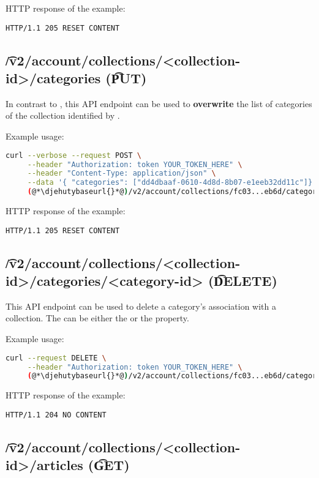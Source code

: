   HTTP response of the example:
\begin{lstlisting}
HTTP/1.1 205 RESET CONTENT
\end{lstlisting}

\subsection{\t{/v2/account/collections/<collection-id>/categories} (\t{PUT})}

  In contrast to , this API endpoint
  can be used to \textbf{overwrite} the list of categories of the collection identified
  by .

  Example usage:
\begin{lstlisting}[language=bash]
curl --verbose --request POST \
     --header "Authorization: token YOUR_TOKEN_HERE" \
     --header "Content-Type: application/json" \
     --data '{ "categories": ["dd4dbaaf-0610-4d8d-8b07-e1eeb32dd11c"]}' \
     (@*\djehutybaseurl{}*@)/v2/account/collections/fc03...eb6d/categories
\end{lstlisting}

  HTTP response of the example:
\begin{lstlisting}
HTTP/1.1 205 RESET CONTENT
\end{lstlisting}

\subsection{\t{/v2/account/collections/<collection-id>/categories/<category-id>} (\t{DELETE})}

  This API endpoint can be used to delete a category's association with a collection.
  The  can be either the  or the  property.

  Example usage:
\begin{lstlisting}[language=bash]
curl --request DELETE \
     --header "Authorization: token YOUR_TOKEN_HERE" \
     (@*\djehutybaseurl{}*@)/v2/account/collections/fc03...eb6d/categories/13558
\end{lstlisting}

  HTTP response of the example:
\begin{lstlisting}
HTTP/1.1 204 NO CONTENT
\end{lstlisting}

\subsection{\t{/v2/account/collections/<collection-id>/articles} (\t{GET})}

